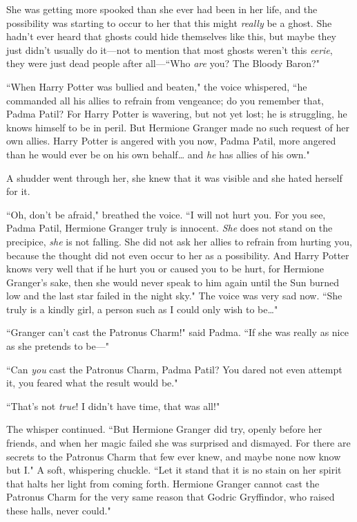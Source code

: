 She was getting more spooked than she ever had been in her life, and the possibility was starting to occur to her that this might \emph{really} be a ghost. She hadn't ever heard that ghosts could hide themselves like this, but maybe they just didn't usually do it—not to mention that most ghosts weren't this \emph{eerie}, they were just dead people after all—``Who \emph{are} you? The Bloody Baron?"

``When Harry Potter was bullied and beaten," the voice whispered, ``he commanded all his allies to refrain from vengeance; do you remember that, Padma Patil? For Harry Potter is wavering, but not yet lost; he is struggling, he knows himself to be in peril. But Hermione Granger made no such request of her own allies. Harry Potter is angered with you now, Padma Patil, more angered than he would ever be on his own behalf{\ldots} and \emph{he} has allies of his own."

A shudder went through her, she knew that it was visible and she hated herself for it.

``Oh, don't be afraid," breathed the voice. ``I will not hurt you. For you see, Padma Patil, Hermione Granger truly is innocent. \emph{She} does not stand on the precipice, \emph{she} is not falling. She did not ask her allies to refrain from hurting you, because the thought did not even occur to her as a possibility. And Harry Potter knows very well that if he hurt you or caused you to be hurt, for Hermione Granger's sake, then she would never speak to him again until the Sun burned low and the last star failed in the night sky." The voice was very sad now. ``She truly is a kindly girl, a person such as I could only wish to be{\ldots}"

``Granger can't cast the Patronus Charm!" said Padma. ``If she was really as nice as she pretends to be—"

``Can \emph{you} cast the Patronus Charm, Padma Patil? You dared not even attempt it, you feared what the result would be."

``That's not \emph{true}! I didn't have time, that was all!"

The whisper continued. ``But Hermione Granger did try, openly before her friends, and when her magic failed she was surprised and dismayed. For there are secrets to the Patronus Charm that few ever knew, and maybe none now know but I." A soft, whispering chuckle. ``Let it stand that it is no stain on her spirit that halts her light from coming forth. Hermione Granger cannot cast the Patronus Charm for the very same reason that Godric Gryffindor, who raised these halls, never could."

